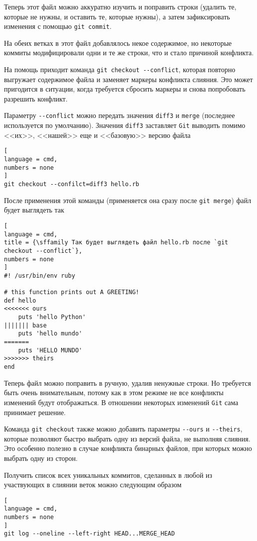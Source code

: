 \documentclass[%
	11pt,
	a4paper,
	utf8,
		]{article}
\begin{document}
Теперь этот файл можно аккуратно изучить и поправить строки (удалить те, которые не нужны, и оставить те, которые нужны), а затем зафиксировать изменения с помощью \texttt{git commit}.

На обеих ветках в этот файл добавлялось некое содержимое, но некоторые коммиты модифицировали одни и те же строки, что и стало причиной конфликта.

На помощь приходит команда \verb|git checkout --conflict|, которая повторно выгружает содержимое файла и заменяет маркеры конфликта слияния. Это может пригодится в ситуации, когда требуется сбросить маркеры и снова попробовать разрешить конфликт. 

Параметру \verb|--conflict| можно передать значения \texttt{diff3} и \texttt{merge} (последнее используется по умолчанию). Значения \texttt{diff3} заставляет \texttt{Git} выводить помимо <<их>>, <<нашей>> еще и <<базовую>> версию файла
\begin{lstlisting}[
language = cmd,
numbers = none
]
git checkout --confilct=diff3 hello.rb
\end{lstlisting}

После применения этой команды (применяется она сразу после \texttt{git merge}) файл будет выглядеть так
\begin{lstlisting}[
language = cmd,
title = {\sffamily Так будет выглядеть файл hello.rb после `git checkout --conflict`},
numbers = none
]
#! /usr/bin/env ruby

# this function prints out A GREETING!
def hello
<<<<<<< ours
    puts 'hello Python'
||||||| base
    puts 'hello mundo'
=======
    puts 'HELLO MUNDO'
>>>>>>> theirs
end
\end{lstlisting}

Теперь файл можно поправить в ручную, удалив ненужные строки. Но требуется быть очень внимательным, потому как в этом режиме не все конфликты изменений будут отображаться. В отношении некоторых изменений \texttt{Git} сама принимает решение.

Команда \texttt{git checkout} также можно добавить параметры \verb|--ours| и \verb|--theirs|, которые позволяют быстро выбрать одну из версий файла, не выполняя слияния. Это особенно полезно в случае конфликта бинарных файлов, при которых можно выбрать одну из сторон.

Получить список всех уникальных коммитов, сделанных в любой из участвующих в слиянии веток можно следующим образом
\begin{lstlisting}[
language = cmd,
numbers = none
]
git log --oneline --left-right HEAD...MERGE_HEAD
\end{lstlisting}
\end{document}
